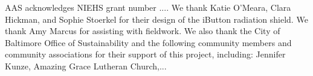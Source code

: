 \documentclass[draft,linenumbers]{agujournal}
\begin{document}
%
%

%

%




%
%
%
%
%
%
%


\acknowledgments
AAS acknowledges NIEHS grant number .... We thank Katie O'Meara, Clara Hickman, and Sophie Stoerkel for their design of the iButton radiation shield. We thank Amy Marcus for assisting with fieldwork.   We also thank the City of Baltimore Office of Sustainability and the following community members and community associations for their support of this project, including: Jennifer Kunze, Amazing Grace Lutheran Church,...
\end{document}
